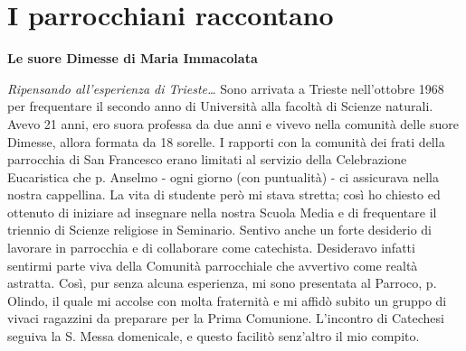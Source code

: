 \chapter{I parrocchiani raccontano}
{}
\begin{center}
\textbf{\Large Le suore Dimesse di Maria Immacolata}
\end{center}
\bigbreak
\textit{Ripensando all’esperienza di Trieste…}
\medbreak
Sono arrivata a Trieste nell’ottobre 1968 per frequentare il secondo anno di Università alla
facoltà di Scienze naturali. Avevo 21 anni, ero suora professa da due anni e vivevo nella comunità 
delle suore Dimesse, allora formata da 18 sorelle. I rapporti con la comunità dei frati della 
parrocchia di San Francesco erano limitati al servizio della Celebrazione Eucaristica che p. 
Anselmo - ogni giorno (con puntualità) - ci assicurava nella nostra cappellina. La vita di studente 
però mi stava stretta; così ho chiesto ed ottenuto di iniziare ad insegnare nella nostra Scuola Media 
e di frequentare il triennio di Scienze religiose in Seminario. Sentivo anche un forte desiderio di 
lavorare in parrocchia e di collaborare come catechista. Desideravo infatti sentirmi parte viva della 
Comunità parrocchiale che avvertivo come realtà astratta. Così, pur senza alcuna esperienza, mi 
sono presentata al Parroco, p. Olindo, il quale mi accolse con molta fraternità e mi affidò subito un 
gruppo di vivaci ragazzini da preparare per la Prima Comunione. L’incontro di Catechesi seguiva la 
S. Messa domenicale, e questo facilitò senz’altro il mio compito. 


